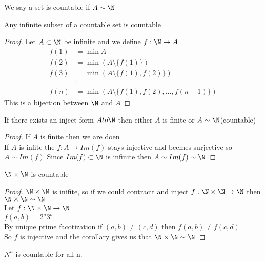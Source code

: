 \documentclass[answers,12pt,addpoints]{exam}
\begin{document}
\begin{definition}
    We say a set is countable if $A \sim \N$
\end{definition}
\begin{lemma}
    Any infinite subset of a countable set is countable
    \begin{proof}
        Let $A \subset \N$ be infinite and we define $f: \N \to A$ \\
        \begin{align*}
            f(1) &= \min A\\
            f(2) &= \min(A \setminus \{f(1)\})\\
            f(3) &= \min(A \setminus \{f(1),f(2)\})\\
            &\vdots\\
            f(n) &= \min(A \setminus \{f(1),f(2),\dots,f(n-1)\})
        \end{align*}
        This is a bijection between $\N$ and $A$
    \end{proof}
\end{lemma}
\begin{corollary}
    If there exists an inject form $A to \N$ then either $A$ is finite or $A \sim \N$(countable)
    \begin{proof}
        If $A$ is finite then we are doen\\
        If $A$ is infite the $f: A \to Im(f)$ stays injective and becmes surjective so $A \sim Im(f)$ Since $Im(f) \subset \N$ is infinite then $A \sim Im(f) \sim \N$
    \end{proof}
\end{corollary}
\begin{proposition}
    $\N \times \N$ is countable
    \begin{proof}
        $\N \times \N$ is inifite, so if we could contracit and inject $f: \N \times \N \to \N$ then $\N \times \N \sim \N$ \\
        Let $f: \N \times \N \to \N$ \\
        $f(a,b) = 2^a 3^b$ \\
        By unique prime facotization if $(a,b) \neq (c,d)$ then $f(a,b) \neq f(c,d)$ \\
        So $f$ is injective and the corollary gives us that $\N \times \N \sim \N$
    \end{proof}
\end{proposition}
\begin{corollary}
    $N^n$ is countable for all n. 
\end{corollary}
\end{document}
